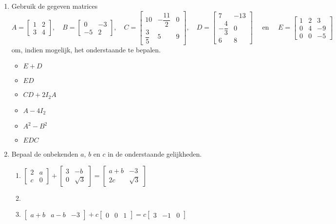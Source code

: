 \begin{enumerate}
\item Gebruik de gegeven matrices 
\[ A =\begin{bmatrix} 1 & 2 \\ 3 & 4  \end{bmatrix}, \quad B=\begin{bmatrix} 0 & -3 \\ -5 & 2  \end{bmatrix}, \quad C= \begin{bmatrix} 10 & -\dfrac{11}{2} & 0 \\ \dfrac{3}{5} & 5 & 9  \end{bmatrix},\quad  D =\begin{bmatrix} 7 & -13 \\ -\dfrac{4}{3} & 0 \\ 6 & 8  \end{bmatrix} \quad \text{ en } \quad E=\begin{bmatrix} 1 & 2 & 3 \\ 0 & 4 & -9 \\ 0& 0 & -5  \end{bmatrix}\]
om, indien mogelijk, het onderstaande te bepalen.%
\begin{multicols}{3}
	\begin{itemize}
		\item $E+D$
		\item $ED$
		\item $CD+2I_2A$
		\item $A-4I_2$
		\item $A^2-B^2$
		\item $EDC$
	\end{itemize}
\end{multicols}	
    
    	
\item Bepaal de onbekenden $a$, $b$ en $c$ in de onderstaande gelijkheden.
 \begin{enumerate}
 \item $\begin{bmatrix}
 2      &a \\
 c      &0
 \end{bmatrix} + \begin{bmatrix}
 3      &-b \\
 0      &\sqrt{3}
 \end{bmatrix} = \begin{bmatrix}
 a+b    &-3 \\
 2c     &\sqrt{3}
 \end{bmatrix}$
 \item []
 \item $\begin{bmatrix} a+b & a-b  & -3\end{bmatrix} + c \begin{bmatrix} 0&0&1\end{bmatrix} = c \begin{bmatrix} 3&-1&0\end{bmatrix}$
 

\end{enumerate}
\end{enumerate}
